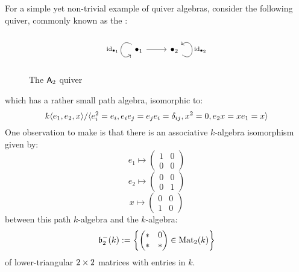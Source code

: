             \begin{example} \label{example: path_algebras_of_A_n_quivers}
                For a simple yet non-trivial example of quiver algebras, consider the following quiver, commonly known as the :
                    \begin{figure}[H]
                        \centering
                        $$
                            \begin{tikzcd}
                                {\bullet_1} \arrow["\id_{\bullet_1}"', loop, distance=2em, in=215, out=145] \arrow[r] & {\bullet_2} \arrow["\id_{\bullet_2}"', loop, distance=2em, in=35, out=325]
                            \end{tikzcd}
                        $$
                        \caption{The $\mathsf{A}_2$ quiver}
                        \label{fig: A_2_quiver}
                    \end{figure}
                which has a rather small path algebra, isomorphic to:
                    $$k\langle e_1, e_2, x\rangle/\langle e_i^2 = e_i, e_i e_j = e_j e_i = \delta_{ij}, x^2 = 0, e_2 x = x e_1 = x\rangle$$
                One observation to make is that there is an associative $k$-algebra isomorphism given by:
                    $$e_1 \mapsto \begin{pmatrix} 1 & 0 \\ 0 & 0 \end{pmatrix}$$
                    $$e_2 \mapsto \begin{pmatrix} 0 & 0 \\ 0 & 1 \end{pmatrix}$$
                    $$x \mapsto \begin{pmatrix} 0 & 0 \\ 1 & 0 \end{pmatrix}$$
                between this path $k$-algebra and the $k$-algebra:
                    $$\mathfrak{b}_2^-(k) := \left\{ \begin{pmatrix} * & 0 \\ * & * \end{pmatrix} \in \mathrm{Mat}_2(k) \right\}$$
                of lower-triangular $2 \x 2$ matrices with entries in $k$.
                    

\end{example}
